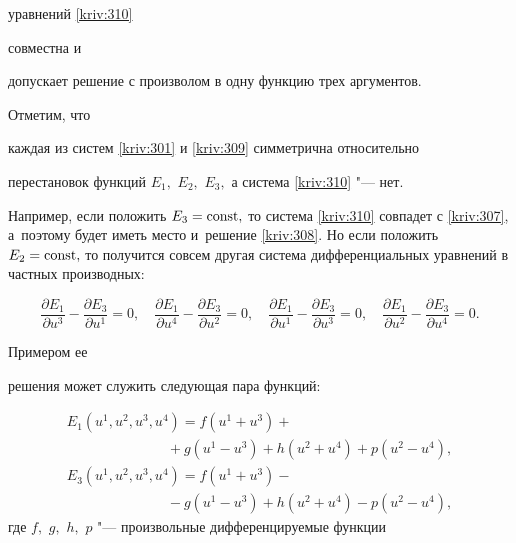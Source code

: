 уравнений \eqref{kriv:310} 

совместна и 

допускает решение с произволом в одну функцию трех аргументов.



Отметим, что 

каждая из систем \eqref{kriv:301} и \eqref{kriv:309} симметрична относительно

перестановок функций $E_{1},$ $E_{2},$ $E_{3},$ а система \eqref{kriv:310} "--- нет. 

Например, если положить $E_{3}=\rm const,$ то система \eqref{kriv:310} совпадет с \eqref{kriv:307}, а~поэтому будет иметь место и~решение \eqref{kriv:308}. Но  если положить $E_{2}=\rm const,$ то получится совсем другая система дифференциальных  уравнений в  частных производных:

\begin{equation*}

\frac{\partial E_{1}}{\partial u^{3}}-\frac{\partial E_{3}}{\partial u^{1}}=0,

\quad 

\frac{\partial E_{1}}{\partial u^{4}}-\frac{\partial E_{3}}{\partial u^{2}}=0,

\quad 

\frac{\partial E_{1}}{\partial u^{1}}-\frac{\partial E_{3}}{\partial u^{3}}=0,

\quad 

\frac{\partial E_{1}}{\partial u^{2}}-\frac{\partial E_{3}}{\partial u^{4}}=0.

\end{equation*}

Примером ее 

решения может служить следующая пара функций:

\begin{equation}

\begin{array}{l} 

E_{1} ( u^{1},u^{2},u^{3},u^{4} ) = f( u^{1}+u^{3} ) + \\

\hspace{3cm} 

{} +g ( u^{1}-u^{3}) +h ( u^{2}+u^{4} ) +p( u^{2}-u^{4}) , \\[2mm]

E_{3}( u^{1},u^{2},u^{3},u^{4} ) =  f( u^{1}+u^{3}) - \\

\hspace{3cm} {} - g( u^{1}-u^{3}) +h( u^{2}+u^{4}) -p( u^{2}-u^{4}) ,

\end{array}

\label{kriv:313}

\end{equation}где $f,$ $g,$ $h,$ $p$ "--- произвольные дифференцируемые функции 

